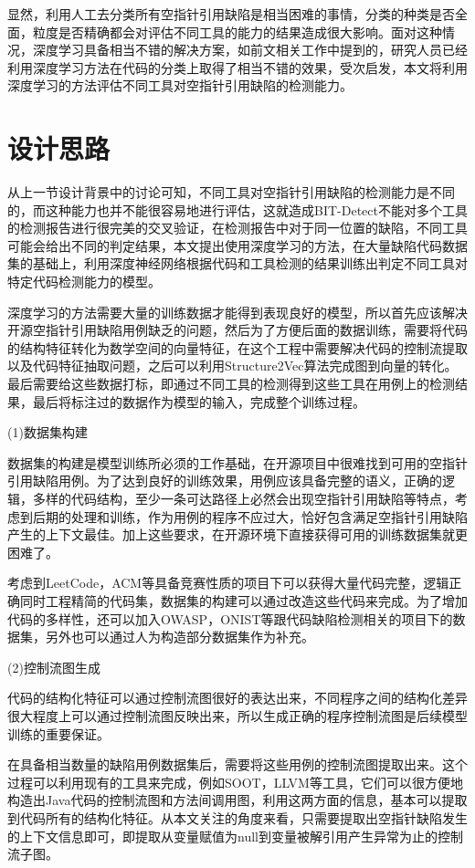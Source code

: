 显然，利用人工去分类所有空指针引用缺陷是相当困难的事情，分类的种类是否全面，粒度是否精确都会对评估不同工具的能力的结果造成很大影响。面对这种情况，深度学习具备相当不错的解决方案，如前文相关工作中提到的，研究人员已经利用深度学习方法在代码的分类上取得了相当不错的效果，受次启发，本文将利用深度学习的方法评估不同工具对空指针引用缺陷的检测能力。

\section{设计思路}
从上一节设计背景中的讨论可知，不同工具对空指针引用缺陷的检测能力是不同的，而这种能力也并不能很容易地进行评估，这就造成BIT-Detect不能对多个工具的检测报告进行很完美的交叉验证，在检测报告中对于同一位置的缺陷，不同工具可能会给出不同的判定结果，本文提出使用深度学习的方法，在大量缺陷代码数据集的基础上，利用深度神经网络根据代码和工具检测的结果训练出判定不同工具对特定代码检测能力的模型。

深度学习的方法需要大量的训练数据才能得到表现良好的模型，所以首先应该解决开源空指针引用缺陷用例缺乏的问题，然后为了方便后面的数据训练，需要将代码的结构特征转化为数学空间的向量特征，在这个工程中需要解决代码的控制流提取以及代码特征抽取问题，之后可以利用Structure2Vec算法完成图到向量的转化。最后需要给这些数据打标，即通过不同工具的检测得到这些工具在用例上的检测结果，最后将标注过的数据作为模型的输入，完成整个训练过程。

(1)数据集构建

数据集的构建是模型训练所必须的工作基础，在开源项目中很难找到可用的空指针引用缺陷用例。为了达到良好的训练效果，用例应该具备完整的语义，正确的逻辑，多样的代码结构，至少一条可达路径上必然会出现空指针引用缺陷等特点，考虑到后期的处理和训练，作为用例的程序不应过大，恰好包含满足空指针引用缺陷产生的上下文最佳。加上这些要求，在开源环境下直接获得可用的训练数据集就更困难了。

考虑到LeetCode，ACM等具备竞赛性质的项目下可以获得大量代码完整，逻辑正确同时工程精简的代码集，数据集的构建可以通过改造这些代码来完成。为了增加代码的多样性，还可以加入OWASP，ONIST等跟代码缺陷检测相关的项目下的数据集，另外也可以通过人为构造部分数据集作为补充。

(2)控制流图生成

代码的结构化特征可以通过控制流图很好的表达出来，不同程序之间的结构化差异很大程度上可以通过控制流图反映出来，所以生成正确的程序控制流图是后续模型训练的重要保证。

在具备相当数量的缺陷用例数据集后，需要将这些用例的控制流图提取出来。这个过程可以利用现有的工具来完成，例如SOOT，LLVM等工具，它们可以很方便地构造出Java代码的控制流图和方法间调用图，利用这两方面的信息，基本可以提取到代码所有的结构化特征。从本文关注的角度来看，只需要提取出空指针缺陷发生的上下文信息即可，即提取从变量赋值为null到变量被解引用产生异常为止的控制流子图。

